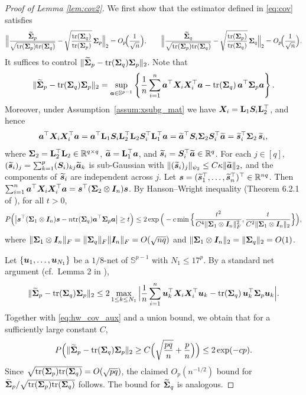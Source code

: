 \documentclass[authoryear,preprint,review,12pt]{elsarticle}
\begin{document}
\begin{proof}[Proof of Lemma \ref{lem:cov2}]
	We first show that the estimator defined in \eqref{eq:cov} satisfies
	\[
	\Big\| \frac{\widetilde{\mathbf{ \Sigma}}_p}{\sqrt{\mbox{tr}(\mathbf{ \Sigma}_p)\mbox{tr}(\mathbf{ \Sigma}_q)} }
	- \sqrt{\frac{\mbox{tr}(\mathbf{ \Sigma}_q)}{\mbox{tr}(\mathbf{ \Sigma}_p)}}\, \mathbf{ \Sigma}_p\Big\|_2
	= O_p\!\Big(\frac{1}{\sqrt{n}}\Big),
	\qquad
	\Big\| \frac{\widetilde{\mathbf{ \Sigma}}_q}{\sqrt{\mbox{tr}(\mathbf{ \Sigma}_p)\mbox{tr}(\mathbf{ \Sigma}_q)} }
	- \sqrt{\frac{\mbox{tr}(\mathbf{ \Sigma}_p)}{\mbox{tr}(\mathbf{ \Sigma}_q)}}\, \mathbf{ \Sigma}_q\Big\|_2
	= O_p\!\Big(\frac{1}{\sqrt{n}}\Big).
	\]
	It suffices to control $\|\widetilde{\mathbf{ \Sigma}}_p - \mbox{tr}(\mathbf{ \Sigma}_q)\mathbf{ \Sigma}_p\|_2$.
	Note that
	\[
	\|\widetilde{\mathbf{ \Sigma}}_p - \mbox{tr}(\mathbf{ \Sigma}_q)\mathbf{ \Sigma}_p \|_2
	= \sup_{\boldsymbol a\in \mathbb{S}^{p-1}}
	\left\{\frac{1}{n}\sum_{i=1}^n \boldsymbol a^{\top}\boldsymbol X_i\boldsymbol X_i^{\top}\boldsymbol a
	-\mbox{tr}(\mathbf{ \Sigma}_q)\, \boldsymbol a^{\top}\mathbf{ \Sigma}_p\boldsymbol a\right\}.
	\]
	Moreover, under Assumption~\ref{assum:xsubg_mat} we have $\boldsymbol X_i=\mathbf{L}_1\boldsymbol S_i\mathbf{L}_2^\top$, and hence
	\[
	\boldsymbol a^{\top}\boldsymbol X_i\boldsymbol X_i^{\top}\boldsymbol a
	= \boldsymbol a^{\top}\mathbf{L}_1\boldsymbol S_i\mathbf{L}_2^{\top}\mathbf{L}_2\boldsymbol S_i^{\top}\mathbf{L}_1^{\top}\boldsymbol a
	= \widetilde{\boldsymbol a}^{\top}\boldsymbol S_i\mathbf{ \Sigma}_2\boldsymbol S_i^{\top}\widetilde{\boldsymbol a}
	= \widetilde{\boldsymbol s}_i^{\top}\mathbf{ \Sigma}_2\,\widetilde{\boldsymbol s}_i,
	\]
	where $\mathbf{ \Sigma}_2=\mathbf{L}_2^{\top}\mathbf{L}_2\in\mathbb{R}^{q\times q}$, $\widetilde{\boldsymbol a}=\mathbf{L}_1^{\top}\boldsymbol a$,
	and $\widetilde{\boldsymbol s}_i=\boldsymbol S_i^{\top}\widetilde{\boldsymbol a}\in\mathbb{R}^{q}$.
	For each $j\in[q]$, $(\widetilde{\boldsymbol s}_i)_j=\sum_{k=1}^p (\boldsymbol S_i)_{kj}\widetilde{\boldsymbol a}_k$ is sub-Gaussian with $\|(\widetilde{\boldsymbol s}_i)_j\|_{\psi_2}\le C\kappa\|\widetilde{\boldsymbol a}\|_2,$
	and the components of $\widetilde{\boldsymbol s}_i$ are independent across $j$.
	Let $\boldsymbol s=(\widetilde{\boldsymbol s}_1^\top,\ldots,\widetilde{\boldsymbol s}_n^\top)^\top\in\mathbb{R}^{nq}$.
	Then $\sum_{i=1}^n \boldsymbol a^{\top}\boldsymbol X_i\boldsymbol X_i^{\top}\boldsymbol a=\boldsymbol s^\top(\mathbf{ \Sigma}_2\otimes \boldsymbol I_n)\boldsymbol s$. 
	By Hanson--Wright inequality (Theorem 6.2.1 of \citet{Vershynin2018}),
	for all $t>0$,
	\begin{equation}\label{eq:hw_cov_aux}
		P\Big( \big|\boldsymbol s^{\top}(\mathbf{ \Sigma}_1\otimes \boldsymbol I_n)\boldsymbol s
		- n\mbox{tr}(\mathbf{ \Sigma}_q)\boldsymbol a^{\top}\mathbf{ \Sigma}_p\boldsymbol a \big| \geq t \Big)
		\leq 2\exp\Big( -c\min\Big\{ \frac{ t^2}{C^4\|\mathbf{ \Sigma}_1\otimes \boldsymbol I_n\|_F^2} ,
		\frac{t}{C^2 \|\mathbf{ \Sigma}_1\otimes \boldsymbol I_n\|_2}\Big\}\Big),
	\end{equation}
	where $\|\mathbf{ \Sigma}_1\otimes \boldsymbol I_n\|_F=\|\mathbf{ \Sigma}_q\|_F\|\boldsymbol I_n\|_F=O(\sqrt{nq})$ and
	$\|\mathbf{ \Sigma}_1\otimes \boldsymbol I_n\|_2=\|\mathbf{ \Sigma}_q\|_2=O(1)$.
	
	Let $\{{\boldsymbol u}_1,\ldots,{\boldsymbol u}_{N_1}\}$ be a $1/8$-net of $\mathbb{S}^{p-1}$ with $N_1\le 17^p$.
	By a standard net argument (cf.\ Lemma 2 in \citet{lu2023sparse}),
	\[
	\|\widetilde{\mathbf{ \Sigma}}_p - \mbox{tr}(\mathbf{ \Sigma}_q)\mathbf{ \Sigma}_p \|_2
	\le 2 \max_{1\le k\le N_1}
	\Big|\frac{1}{n}\sum_{i=1}^n {\boldsymbol u}_k^{\top}\boldsymbol X_i\boldsymbol X_i^{\top}{\boldsymbol u}_k
	-\mbox{tr}(\mathbf{ \Sigma}_q)\, {\boldsymbol u}_k^{\top}\mathbf{ \Sigma}_p{\boldsymbol u}_k\Big|.
	\]
	Together with \eqref{eq:hw_cov_aux} and a union bound, we obtain that for a sufficiently large constant $C$,
	\[
	P\Big( \|\widetilde{\mathbf{ \Sigma}}_p - \mbox{tr}(\mathbf{ \Sigma}_q)\mathbf{ \Sigma}_p \|_2
	\ge C\Big(\sqrt{\frac{pq}{n}}+\frac{p}{n}\Big)\Big)\le 2\exp(-cp).
	\]
	Since $\sqrt{\mbox{tr}(\mathbf{ \Sigma}_p)\mbox{tr}(\mathbf{ \Sigma}_q)}=O(\sqrt{pq})$, the claimed $O_p(n^{-1/2})$ bound for
	$\widetilde{\mathbf{ \Sigma}}_p/\sqrt{\mbox{tr}(\mathbf{ \Sigma}_p)\mbox{tr}(\mathbf{ \Sigma}_q)}$ follows. The bound for $\widetilde{\mathbf{ \Sigma}}_q$ is analogous.
	

\end{proof}
\end{document}
